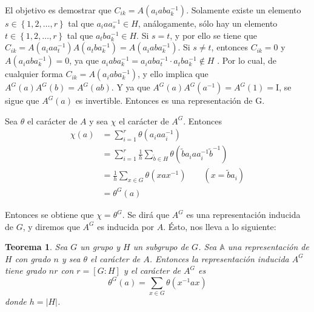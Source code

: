 \documentclass[12pt]{book}
\newtheorem{theorem}{Teorema}[section]
\theoremstyle{definition}
\newcounter{in}
\begin{document}
El objetivo es demostrar que $C_{ik}= A(a_{i} ab
a_{k}^{-1})$. Solamente existe un elemento
$s \in \left\{1, 2, \ldots, r \right\}$ tal que
$a_{i} a a_{s}^{-1} \in H$, análogamente, sólo hay un elemento
$t \in \left\{1, 2, \ldots, r \right\}$ tal que
$a_{t} b a_{k}^{-1} \in H$. Si $s=t$, y por ello se tiene que
$C_{ik}=A(a_{i} a a_{t}^{-1}) A(a_{t} b a_{k}^{-1})=A(a_{i} ab
a_{k}^{-1})$. Si $s \neq t$, entonces $C_{ik}=0$
y~$A(a_{i} ab a_{k}^{-1}) = 0$, ya que
$a_{i} ab a_{k}^{-1} = a_{i} ab a_{t}^{-1} \cdot a_{t} b a_{k}^{-1}
\notin H$ . Por lo cual, de cualquier forma
$C_{ik} = A(a_{i} ab a_{k}^{-1})$, y ello implica que
$A^{G}(a)A^{G}(b)=A^{G}(ab)$. Y ya que
$A^{G}(a)A^{G}(a^{-1})=A^{G}(1)=\mathrm{I}$, se sigue que $A^{G}(a)$
es invertible. Entonces es una representación de G.

Sea $\theta$ el carácter de $A$ y sea $\chi$ el carácter de
$A^{G}$. Entonces
\begin{equation}
  \label{eq:64}
  \begin{aligned}
    \chi(a) &= \sum_{i=1}^{r} \theta(a_{i} a a_{i}^{-1}) \\
    & = \sum_{i=1}^{r} \frac{1}{h} \sum_{\tilde{b} \in H} \theta(\tilde{b} a_{i} a a_{i}^{-1} \tilde{b}^{-1})\\
    &= \frac{1}{h} \sum_{x \in G} \theta(x a x^{-1}) \qquad (x=\tilde{b}a_{i})\\
    &= \theta^{G}(a)
  \end{aligned}
\end{equation}

Entonces se obtiene que $\chi=\theta^{G}$. Se dirá que $A^{G}$ es una
representación inducida de $G$, y diremos que $A^{G}$ es inducida por
$A$. Ésto, nos lleva a lo siguiente:

\begin{theorem}
  \label{t5_2}
  Sea $G$ un grupo y $H$ un subgrupo de $G$. Sea $\mathbb{A}$ una
  representación de $H$ con grado $n$ y sea $\theta$ el carácter de
  $A$. Entonces la representación inducida $A^{G}$ tiene grado $nr$
  con $r=[G:H]$ y el carácter de $A^{G}$ es
  \begin{equation*}
    \theta^{G}(a)= \sum_{x \in G} \theta(x^{-1} a x)
  \end{equation*}
  donde $h= |H|$.
\end{theorem}
\end{document}
